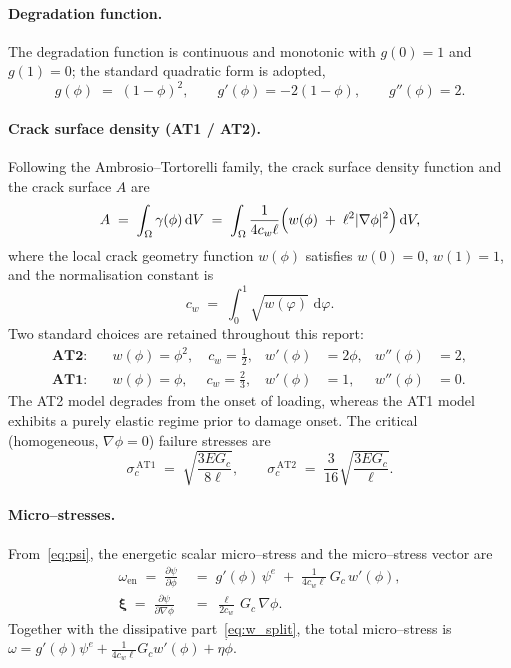 \documentclass[12pt,a4paper]{article}
\newcommand{\bxi}{\boldsymbol{\xi}}
\newcommand{\dd}{\,\mathrm{d}}
\begin{document}
	\paragraph{Degradation function.}
	The degradation function is continuous and monotonic with $g(0)=1$ and
	$g(1)=0$; the standard quadratic form is adopted,
	\begin{equation}\label{eq:g}
		g(\phi) \;=\; (1-\phi)^2,
		\qquad g'(\phi)=-2(1-\phi),
		\qquad g''(\phi)=2.
	\end{equation}

	\paragraph{Crack surface density (AT1 / AT2).}
	Following the Ambrosio--Tortorelli family, the crack surface density function
	and the crack surface $A$ are
	\begin{equation}\label{eq:gamma}
		A \;=\; \int_{\Omega}\gamma(\phi)\dd V
		\;=\; \int_{\Omega}\frac{1}{4c_w\ell}\Bigl(w(\phi) \;+\; \ell^2|\nabla\phi|^2\Bigr)\dd V,
	\end{equation}
	where the local crack geometry function $w(\phi)$ satisfies $w(0)=0$, $w(1)=1$,
	and the normalisation constant is
	\begin{equation}\label{eq:cw}
		c_w \;=\; \int_0^1\sqrt{w(\varphi)}\,\dd\varphi .
	\end{equation}
	Two standard choices are retained throughout this report:
	\begin{align}
		\textbf{AT2:}\quad & w(\phi)=\phi^2,\quad c_w=\tfrac12, &
		w'(\phi)&=2\phi, & w''(\phi)&=2, \label{eq:AT2}\\[2pt]
		\textbf{AT1:}\quad & w(\phi)=\phi,\quad\; c_w=\tfrac23, &
		w'(\phi)&=1, & w''(\phi)&=0. \label{eq:AT1}
	\end{align}
	The AT2 model degrades from the onset of loading, whereas the AT1 model
	exhibits a purely elastic regime prior to damage onset. The critical
	(homogeneous, $\nabla\phi=0$) failure stresses are
	\begin{equation}\label{eq:sigc_models}
		\sigma_c^{\,\mathrm{AT1}} \;=\; \sqrt{\frac{3EG_c}{8\ell}},
		\qquad
		\sigma_c^{\,\mathrm{AT2}} \;=\; \frac{3}{16}\sqrt{\frac{3EG_c}{\ell}} .
	\end{equation}

	\paragraph{Micro--stresses.}
	From~\eqref{eq:psi}, the energetic scalar micro--stress and the
	micro--stress vector are
	\begin{align}
		\omega_{\mathrm{en}} \;=\; \frac{\partial\psi}{\partial\phi}
		&\;=\; g'(\phi)\,\psi^e \;+\; \frac{1}{4c_w\ell}\,G_c\,w'(\phi), \label{eq:wen}\\[4pt]
		\bxi \;=\; \frac{\partial\psi}{\partial\nabla\phi}
		&\;=\; \frac{\ell}{2c_w}\,G_c\,\nabla\phi. \label{eq:xi}
	\end{align}
	Together with the dissipative part~\eqref{eq:w_split}, the total
	micro--stress is $\omega=g'(\phi)\psi^e+\tfrac{1}{4c_w\ell}G_c w'(\phi)+\eta\dot\phi$.
\end{document}
